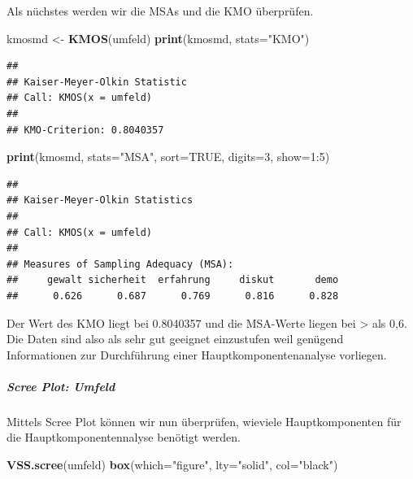\documentclass[]{article}
\newenvironment{Shaded}{\begin{snugshade}}{\end{snugshade}}
\newcommand{\KeywordTok}[1]{\textcolor[rgb]{0.13,0.29,0.53}{\textbf{{#1}}}}
\newcommand{\DataTypeTok}[1]{\textcolor[rgb]{0.13,0.29,0.53}{{#1}}}
\newcommand{\DecValTok}[1]{\textcolor[rgb]{0.00,0.00,0.81}{{#1}}}
\newcommand{\StringTok}[1]{\textcolor[rgb]{0.31,0.60,0.02}{{#1}}}
\newcommand{\OtherTok}[1]{\textcolor[rgb]{0.56,0.35,0.01}{{#1}}}
\newcommand{\NormalTok}[1]{{#1}}
\let\oldsubparagraph\subparagraph
\renewcommand{\subparagraph}[1]{\oldsubparagraph{#1}\mbox{}}
\begin{document}
Als nüchstes werden wir die MSAs und die KMO überprüfen.

\begin{Shaded}
\begin{Highlighting}[]
\NormalTok{kmosmd <-}\StringTok{ }\KeywordTok{KMOS}\NormalTok{(umfeld)}
\KeywordTok{print}\NormalTok{(kmosmd, }\DataTypeTok{stats=}\StringTok{"KMO"}\NormalTok{)}
\end{Highlighting}
\end{Shaded}

\begin{verbatim}
## 
## Kaiser-Meyer-Olkin Statistic
## Call: KMOS(x = umfeld)
## 
## KMO-Criterion: 0.8040357
\end{verbatim}

\begin{Shaded}
\begin{Highlighting}[]
\KeywordTok{print}\NormalTok{(kmosmd, }\DataTypeTok{stats=}\StringTok{"MSA"}\NormalTok{, }\DataTypeTok{sort=}\OtherTok{TRUE}\NormalTok{, }\DataTypeTok{digits=}\DecValTok{3}\NormalTok{, }\DataTypeTok{show=}\DecValTok{1}\NormalTok{:}\DecValTok{5}\NormalTok{)}
\end{Highlighting}
\end{Shaded}

\begin{verbatim}
## 
## Kaiser-Meyer-Olkin Statistics
## 
## Call: KMOS(x = umfeld)
## 
## Measures of Sampling Adequacy (MSA):
##     gewalt sicherheit  erfahrung     diskut       demo 
##      0.626      0.687      0.769      0.816      0.828
\end{verbatim}

Der Wert des KMO liegt bei 0.8040357 und die MSA-Werte liegen bei
\textgreater{} als 0,6. Die Daten sind also als sehr gut geeignet
einzustufen weil genügend Informationen zur Durchführung einer
Hauptkomponentenanalyse vorliegen.

\subparagraph{Scree Plot: Umfeld}\label{scree-plot-umfeld}

Mittels Scree Plot können wir nun überprüfen, wieviele Hauptkomponenten
für die Hauptkomponentennalyse benötigt werden.

\begin{Shaded}
\begin{Highlighting}[]
\KeywordTok{VSS.scree}\NormalTok{(umfeld)}
\KeywordTok{box}\NormalTok{(}\DataTypeTok{which=}\StringTok{"figure"}\NormalTok{, }\DataTypeTok{lty=}\StringTok{"solid"}\NormalTok{, }\DataTypeTok{col=}\StringTok{"black"}\NormalTok{)}
\end{Highlighting}
\end{Shaded}
\end{document}
